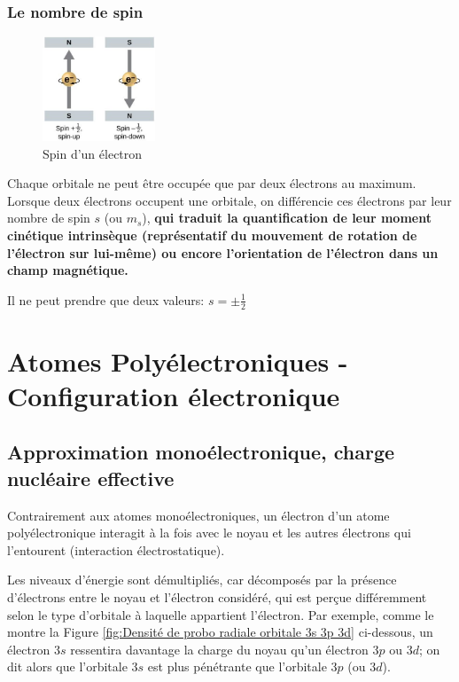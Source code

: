 \documentclass{article}
\begin{document}
\begin{center}
\quad {} \quad {}
\end{center}


\subsubsection{Le nombre de spin}\label{section: spin}

\begin{figure}
    \centering
    \vspace{-1cm}
    \includegraphics[width=0.3\textwidth]{Fig/spin.jpg} 
    \caption{Spin d'un électron}
    \label{fig:spin}
\end{figure}
Chaque orbitale ne peut être occupée que par deux électrons au maximum. Lorsque deux électrons occupent une orbitale, on différencie ces électrons par leur nombre de spin $s$ (ou $m_s$), \textbf{qui traduit la quantification de leur moment cinétique intrinsèque (représentatif du mouvement de rotation de l'électron sur lui-même) ou encore l'orientation de l'électron dans un champ magnétique.}

Il ne peut prendre que deux valeurs: $s=\pm \frac{1}{2}$



\section{Atomes Polyélectroniques - Configuration électronique}

\subsection{Approximation monoélectronique, charge nucléaire effective}

Contrairement aux atomes monoélectroniques, un électron d'un atome polyélectronique interagit à la fois avec le noyau et les autres électrons qui l'entourent (interaction électrostatique).

Les niveaux d'énergie sont démultipliés, car décomposés par la présence d'électrons entre le noyau et l'électron considéré, qui est perçue différemment selon le type d'orbitale à laquelle appartient l'électron. Par exemple, comme le montre la Figure \ref{fig:Densité de probo radiale orbitale 3s 3p 3d} ci-dessous, un électron $3s$ ressentira davantage la charge du noyau qu'un électron $3p$ ou $3d$; on dit alors que l'orbitale $3s$ est plus pénétrante que l'orbitale $3p$ (ou $3d$).
\end{document}
